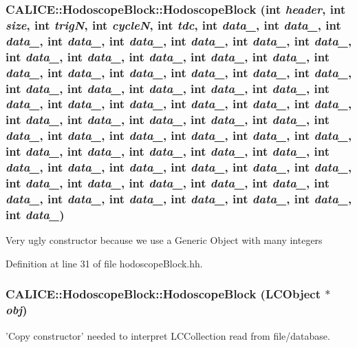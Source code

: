 \subsubsection[{HodoscopeBlock}]{\setlength{\rightskip}{0pt plus 5cm}CALICE::HodoscopeBlock::HodoscopeBlock (int {\em header}, \/  int {\em size}, \/  int {\em trigN}, \/  int {\em cycleN}, \/  int {\em tdc}, \/  int {\em data\_}, \/  int {\em data\_}, \/  int {\em data\_}, \/  int {\em data\_}, \/  int {\em data\_}, \/  int {\em data\_}, \/  int {\em data\_}, \/  int {\em data\_}, \/  int {\em data\_}, \/  int {\em data\_}, \/  int {\em data\_}, \/  int {\em data\_}, \/  int {\em data\_}, \/  int {\em data\_}, \/  int {\em data\_}, \/  int {\em data\_}, \/  int {\em data\_}, \/  int {\em data\_}, \/  int {\em data\_}, \/  int {\em data\_}, \/  int {\em data\_}, \/  int {\em data\_}, \/  int {\em data\_}, \/  int {\em data\_}, \/  int {\em data\_}, \/  int {\em data\_}, \/  int {\em data\_}, \/  int {\em data\_}, \/  int {\em data\_}, \/  int {\em data\_}, \/  int {\em data\_}, \/  int {\em data\_}, \/  int {\em data\_}, \/  int {\em data\_}, \/  int {\em data\_}, \/  int {\em data\_}, \/  int {\em data\_}, \/  int {\em data\_}, \/  int {\em data\_}, \/  int {\em data\_}, \/  int {\em data\_}, \/  int {\em data\_}, \/  int {\em data\_}, \/  int {\em data\_}, \/  int {\em data\_}, \/  int {\em data\_}, \/  int {\em data\_}, \/  int {\em data\_}, \/  int {\em data\_}, \/  int {\em data\_}, \/  int {\em data\_}, \/  int {\em data\_}, \/  int {\em data\_}, \/  int {\em data\_}, \/  int {\em data\_}, \/  int {\em data\_}, \/  int {\em data\_}, \/  int {\em data\_}, \/  int {\em data\_}, \/  int {\em data\_}, \/  int {\em data\_}, \/  int {\em data\_}, \/  int {\em data\_}, \/  int {\em data\_})\hspace{0.3cm}{\ttfamily  [inline]}}\label{classCALICE_1_1HodoscopeBlock_ac1fc377a4debcaf515664a0c2ce34642}
Very ugly constructor because we use a Generic Object with many integers 

Definition at line 31 of file hodoscopeBlock.hh.
\subsubsection[{HodoscopeBlock}]{\setlength{\rightskip}{0pt plus 5cm}CALICE::HodoscopeBlock::HodoscopeBlock (LCObject $\ast$ {\em obj})\hspace{0.3cm}{\ttfamily  [inline]}}\label{classCALICE_1_1HodoscopeBlock_a81a5b6d8579806ed24088cc154c1fe98}
'Copy constructor' needed to interpret LCCollection read from file/database. 


